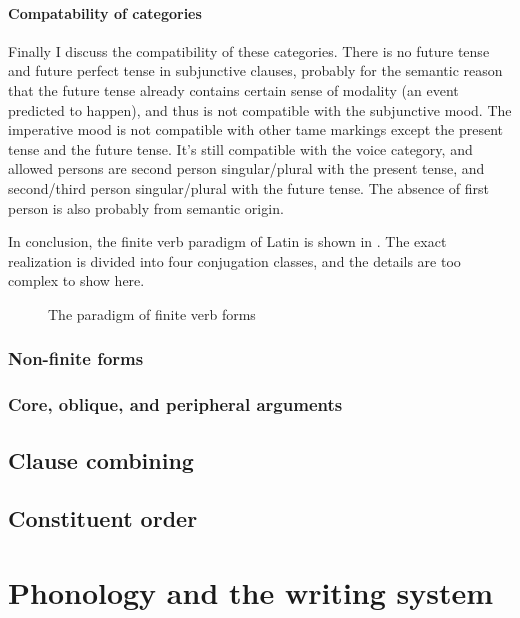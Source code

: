 \documentclass[UTF8, a4paper, oneside, scheme=plain]{ctexrep}
\begin{document}
\subsubsection{Compatability of categories}

Finally I discuss the compatibility of these categories.
There is no future tense and future perfect tense in subjunctive clauses,
probably for the semantic reason
that the future tense already contains certain sense of modality
(an event predicted to happen),
and thus is not compatible with the subjunctive mood.
The imperative mood is not compatible with other \ac{tame} markings
except the present tense and the future tense.
It's still compatible with the voice category,
and allowed persons are 
second person singular/plural with the present tense,
and second/third person singular/plural with the future tense.
The absence of first person is also probably from semantic origin.

In conclusion, the finite verb paradigm of Latin is shown in .
The exact realization is divided into four conjugation classes,
and the details are too complex to show here.

\begin{figure}[H]
    \centering
    
    \caption{The paradigm of finite verb forms}
    \label{fig:paradigm-finite-verb}
\end{figure}

\subsection{Non-finite forms}

\subsection{Core, oblique, and peripheral arguments}

\section{Clause combining}

\section{Constituent order}\label{sec:constituent-order-abs}


\chapter{Phonology and the writing system}
\end{document}
